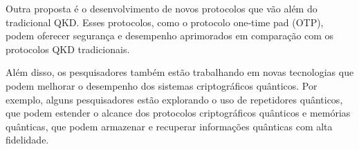 Outra proposta é o desenvolvimento de novos protocolos que vão além do tradicional QKD. Esses protocolos, como o protocolo one-time pad (OTP), podem oferecer segurança e desempenho aprimorados em comparação com os protocolos QKD tradicionais.

Além disso, os pesquisadores também estão trabalhando em novas tecnologias que podem melhorar o desempenho dos sistemas criptográficos quânticos. Por exemplo, alguns pesquisadores estão explorando o uso de repetidores quânticos, que podem estender o alcance dos protocolos criptográficos quânticos e memórias quânticas, que podem armazenar e recuperar informações quânticas com alta fidelidade.

\newpage
